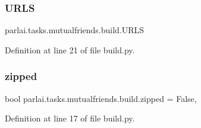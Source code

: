 \subsubsection{\texorpdfstring{U\+R\+LS}{URLS}}
{\footnotesize\ttfamily parlai.\+tasks.\+mutualfriends.\+build.\+U\+R\+LS}



Definition at line 21 of file build.\+py.

\mbox{\label{namespaceparlai_1_1tasks_1_1mutualfriends_1_1build_a7608ecb31d5f4d7f0c95cabe80f2234e}} 
\subsubsection{\texorpdfstring{zipped}{zipped}}
{\footnotesize\ttfamily bool parlai.\+tasks.\+mutualfriends.\+build.\+zipped = False,}



Definition at line 17 of file build.\+py.

